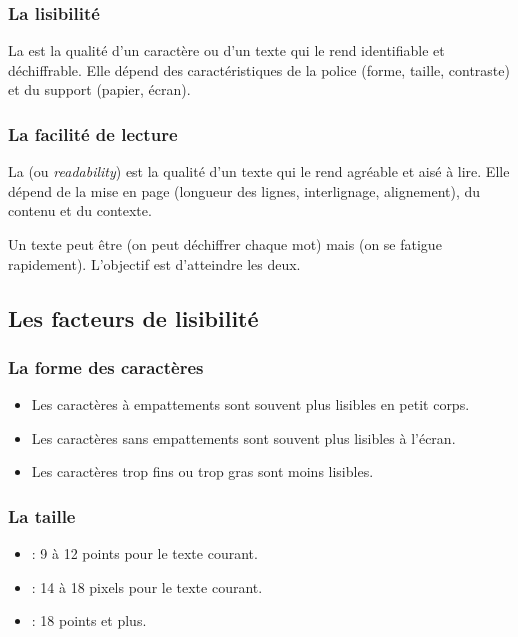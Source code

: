 \subsubsection{La lisibilité}

La  est la qualité d'un caractère ou d'un texte qui le rend identifiable et déchiffrable. Elle dépend des caractéristiques de la police (forme, taille, contraste) et du support (papier, écran).

\subsubsection{La facilité de lecture}

La  (ou \emph{readability}) est la qualité d'un texte qui le rend agréable et aisé à lire. Elle dépend de la mise en page (longueur des lignes, interlignage, alignement), du contenu et du contexte.

Un texte peut être  (on peut déchiffrer chaque mot) mais  (on se fatigue rapidement). L'objectif est d'atteindre les deux.

\subsection{Les facteurs de lisibilité}

\subsubsection{La forme des caractères}

\begin{itemize}
    \item Les caractères à empattements sont souvent plus lisibles en petit corps.
    \item Les caractères sans empattements sont souvent plus lisibles à l'écran.
    \item Les caractères trop fins ou trop gras sont moins lisibles.
\end{itemize}

\subsubsection{La taille}

\begin{itemize}
    \item {} : 9 à 12 points pour le texte courant.
    \item {} : 14 à 18 pixels pour le texte courant.
    \item {} : 18 points et plus.
\end{itemize}

